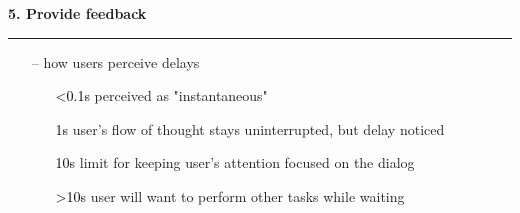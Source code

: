 \documentclass[pdf]{beamer}
\begin{document}
\begin{frame}
\begin{figure}[H]
\begin{minipage}[b]{0.5\linewidth}
  \end{minipage} 
  \end{figure}


\end{frame}



\begin{frame}
{\textbf{5. Provide feedback}}{\textcolor{red}{\rule{12cm}{1.2pt}}}
    
    \begin{itemize}
    	
        \item[--] how users perceive delays
        \begin{itemize}
        	 \bigskip
        	\item[\textcolor{black}{<0.1s}] perceived as "instantaneous"
             \bigskip
            \item[\textcolor{black}{1s}] user's flow of thought stays uninterrupted, but delay noticed
             \bigskip
             \item[\textcolor{black}{10s}] limit for keeping user's attention focused on the dialog
              \bigskip
              \item[\textcolor{black}{>10s}] user will want to perform other tasks while waiting
        \end{itemize}
    \end{itemize}
 
\end{frame}
\end{document}
